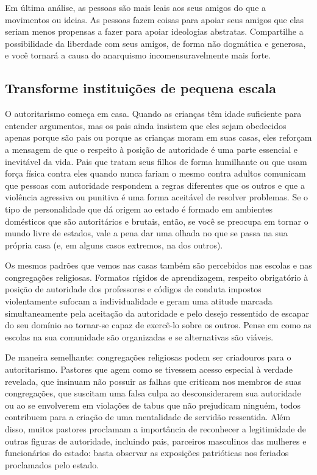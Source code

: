 Em última análise, as pessoas são mais leais aos seus amigos do que a movimentos ou ideias. As pessoas fazem coisas para apoiar seus amigos que elas seriam menos propensas a fazer para apoiar ideologias abstratas. Compartilhe a possibilidade da liberdade com seus amigos, de forma não dogmática e generosa, e você tornará a causa do anarquismo incomensuravelmente mais forte.

\subsection*{Transforme instituições de pequena escala}

O autoritarismo começa em casa. Quando as crianças têm idade suficiente para entender argumentos, mas os pais ainda insistem que eles sejam obedecidos apenas porque são pais ou porque as crianças moram em suas casas, eles reforçam a mensagem de que o respeito à posição de autoridade é uma parte essencial e inevitável da vida. Pais que tratam seus filhos de forma humilhante ou que usam força física contra eles quando nunca fariam o mesmo contra adultos comunicam que pessoas com autoridade respondem a regras diferentes que os outros e que a violência agressiva ou punitiva é uma forma aceitável de resolver problemas. Se o tipo de personalidade que dá origem ao estado é formado em ambientes domésticos que são autoritários e brutais, então, se você se preocupa em tornar o mundo livre de estados, vale a pena dar uma olhada no que se passa na sua própria casa (e, em alguns casos extremos, na dos outros).

Os mesmos padrões que vemos nas casas também são percebidos nas escolas e nas congregações religiosas. Formatos rígidos de aprendizagem, respeito obrigatório à posição de autoridade dos professores e códigos de conduta impostos violentamente sufocam a individualidade e geram uma atitude marcada simultaneamente pela aceitação da autoridade e pelo desejo ressentido de escapar do seu domínio ao tornar-se capaz de exercê-lo sobre os outros. Pense em como as escolas na sua comunidade são organizadas e se alternativas são viáveis.

De maneira semelhante: congregações religiosas podem ser criadouros para o autoritarismo. Pastores que agem como se tivessem acesso especial à verdade revelada, que insinuam não possuir as falhas que criticam nos membros de suas congregações, que suscitam uma falsa culpa ao desconsiderarem sua autoridade ou ao se envolverem em violações de tabus que não prejudicam ninguém, todos contribuem para a criação de uma mentalidade de servidão ressentida. Além disso, muitos pastores proclamam a importância de reconhecer a legitimidade de outras figuras de autoridade, incluindo pais, parceiros masculinos das mulheres e funcionários do estado: basta observar as exposições patrióticas nos feriados proclamados pelo estado.

